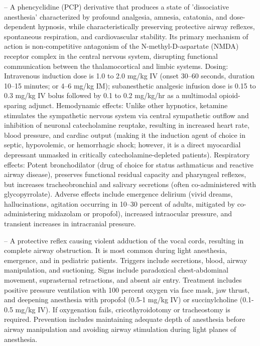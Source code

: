 -- A phencyclidine (PCP) derivative that produces a state of 'dissociative anesthesia' characterized by profound analgesia, amnesia, catatonia, and dose-dependent hypnosis, while characteristically preserving protective airway reflexes, spontaneous respiration, and cardiovascular stability. Its primary mechanism of action is non-competitive antagonism of the N-methyl-D-aspartate (NMDA) receptor complex in the central nervous system, disrupting functional communication between the thalamocortical and limbic systems. Dosing: Intravenous induction dose is 1.0 to 2.0 mg/kg IV (onset 30--60 seconds, duration 10--15 minutes; or 4--6 mg/kg IM); subanesthetic analgesic infusion dose is 0.15 to 0.3 mg/kg IV bolus followed by 0.1 to 0.2 mg/kg/hr as a multimodal opioid-sparing adjunct. Hemodynamic effects: Unlike other hypnotics, ketamine stimulates the sympathetic nervous system via central sympathetic outflow and inhibition of neuronal catecholamine reuptake, resulting in increased heart rate, blood pressure, and cardiac output (making it the induction agent of choice in septic, hypovolemic, or hemorrhagic shock; however, it is a direct myocardial depressant unmasked in critically catecholamine-depleted patients). Respiratory effects: Potent bronchodilator (drug of choice for status asthmaticus and reactive airway disease), preserves functional residual capacity and pharyngeal reflexes, but increases tracheobronchial and salivary secretions (often co-administered with glycopyrrolate). Adverse effects include emergence delirium (vivid dreams, hallucinations, agitation occurring in 10--30 percent of adults, mitigated by co-administering midazolam or propofol), increased intraocular pressure, and transient increases in intracranial pressure.

-- A protective reflex causing violent adduction of the vocal cords, resulting in complete airway obstruction. It is most common during light anesthesia, emergence, and in pediatric patients. Triggers include secretions, blood, airway manipulation, and suctioning. Signs include paradoxical chest-abdominal movement, suprasternal retractions, and absent air entry. Treatment includes positive pressure ventilation with 100 percent oxygen via face mask, jaw thrust, and deepening anesthesia with propofol (0.5-1 mg/kg IV) or succinylcholine (0.1-0.5 mg/kg IV). If oxygenation fails, cricothyroidotomy or tracheostomy is required. Prevention includes maintaining adequate depth of anesthesia before airway manipulation and avoiding airway stimulation during light planes of anesthesia.

